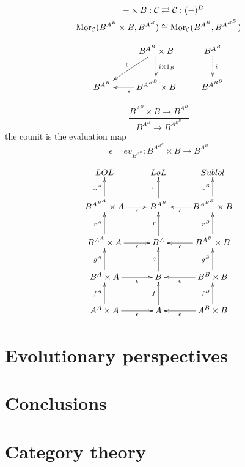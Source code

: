 \documentclass[aps,twocolumn]{revtex4-1}
\begin{document}
\begin{align*}
- \times B: \mathcal{C} & \rightleftarrows \mathcal{C}: (-)^B\\
\mathop{\rm Mor}\nolimits_{\mathcal{C}}(B^{A^B} \times B, B^{A^B}) & \cong  \mathop{\rm Mor}\nolimits_{\mathcal{C}}(B^{A^B}, B^{A^{B^B}})
\end{align*}

			$$
			\xymatrix{
			& B^{A^B} \times B \ar[d]^-{i \times 1_B} \ar[dl]_{\bar{i}} & B^{A^B} \ar@{.>}[d]^-{i}\\
			B^{A^B} & B^{A^{B^B}} \times B \ar[l]^{\epsilon} & B^{A^{B^B}}
			}
			$$
	
		$$
			\frac{B^{A^B} \times B \longrightarrow B^{A^B}}{B^{A^B} \longrightarrow B^{A^{B^B}}}
		$$
		the counit is the evaluation map
		$$
			\epsilon = ev_{B^{A^B}} \colon B^{A^{B^B}} \times B \longrightarrow B^{A^B}
		$$
	



$$
			\xymatrix{
			 LOL &LoL &Sublol \\
			  B^{A^{B^A}} \times A \ar[r]_-{\epsilon} \ar[u]^-{..^A} & B^{A^B} \ar[u]^-{..} & B^{A^{B^B}} \times B\ar[l]^-{\epsilon}\ar[u]^-{..^B} \\
			 B^{A^A} \times A \ar[r]_-{\epsilon} \ar[u]^-{r^A} & B^A \ar[u]^-{r} & B^{A^B} \times B\ar[l]^-{\epsilon}\ar[u]^-{r^B} \\
			B^A \times A \ar[r]_-{\epsilon} \ar[u]^-{g^A} & B \ar[u]^-{g} & B^B \times B\ar[l]^-{\epsilon}\ar[u]^-{g^B} \\
			A^A \times A \ar[r]_-{\epsilon} \ar[u]^-{f^A} & 
			A\ar[u]^-{f} & A^B\times B\ar[l]^-{\epsilon}\ar[u]^-{f^B} }
			$$


	
\section{Evolutionary perspectives}

\section{Conclusions}


 



\appendix

\section{Category theory}\label{app:CatTh}


%
\end{document}
